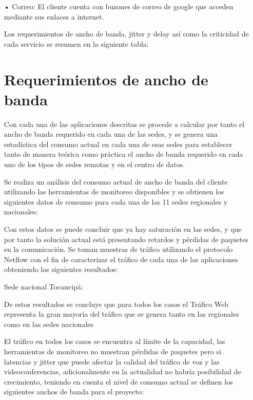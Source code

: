 \begin{itemize}
\item[•]Correo: El cliente cuenta con buzones de correo de google que acceden mediante sus enlaces a internet.

Los requerimientos de ancho de banda, jitter y delay así como la criticidad de cada servicio se resumen en la siguiente tabla:

\section{Requerimientos de ancho de banda} %
\label{sec:Requerimientos de ancho de banda}


Con cada una de las aplicaciones descritas se procede a calcular por tanto el ancho de banda requerido en cada una de las sedes, y se genera una estadística del consumo actual en cada una de esas sedes para establecer tanto de manera teórica como práctica el ancho de banda requerido en cada uno de los tipos de sedes remotas y en el centro de datos.

Se realiza un análisis del consumo actual de ancho de banda del cliente utilizando las herramientas de monitoreo disponibles y se obtienen los siguientes datos de consumo para cada una de las 11 sedes regionales y nacionales:

Con estos datos se puede concluir que ya hay saturación en las sedes, y que por tanto la solución actual está presentando retardos y pérdidas de paquetes en la comunicación.
Se toman muestras de tráfico utilizando el protocolo Netflow con el fin de caracterizar el tráfico de cada una de las aplicaciones obteniendo los siguientes resultados:

Sede nacional Tocancipá:

De estos resultados se concluye que para todos los casos el Tráfico Web representa la gran mayoría del tráfico que se genera tanto en las regionales como en las sedes nacionales

El tráfico en todos los casos se encuentra al límite de la capacidad, las herramientas de monitoreo no muestran pérdidas de paquetes pero si latencias y jitter que puede afectar la calidad del tráfico de voz y las videoconferencias, adicionalmente en la actualidad no habría posibilidad de crecimiento, teniendo en cuenta el nivel de consumo actual se definen los siguientes anchos de banda para el proyecto:
\end{itemize}